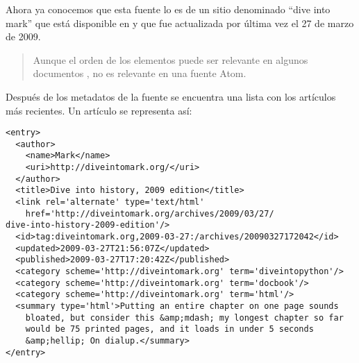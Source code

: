 Ahora ya conocemos que esta fuente lo es de un sitio denominado ``dive into mark'' que está disponible en  y que fue actualizada por última vez el 27 de marzo de 2009.

\begin{quote}
Aunque el orden de los elementos puede ser relevante en algunos documentos , no es relevante en una fuente Atom.
\end{quote}

Después de los metadatos de la fuente se encuentra una lista con los artículos más recientes. Un artículo se representa así:

\noindent\begin{minipage}{\textwidth}
\begin{lstlisting}[mathescape=True]
<entry>
  <author>
    <name>Mark</name>
    <uri>http://diveintomark.org/</uri>
  </author>
  <title>Dive into history, 2009 edition</title>
  <link rel='alternate' type='text/html'     
    href='http://diveintomark.org/archives/2009/03/27/
dive-into-history-2009-edition'/>
  <id>tag:diveintomark.org,2009-03-27:/archives/20090327172042</id>
  <updated>2009-03-27T21:56:07Z</updated>     
  <published>2009-03-27T17:20:42Z</published>        
  <category scheme='http://diveintomark.org' term='diveintopython'/>
  <category scheme='http://diveintomark.org' term='docbook'/>
  <category scheme='http://diveintomark.org' term='html'/>
  <summary type='html'>Putting an entire chapter on one page sounds
    bloated, but consider this &amp;mdash; my longest chapter so far
    would be 75 printed pages, and it loads in under 5 seconds
    &amp;hellip; On dialup.</summary>
</entry>             
\end{lstlisting}
\end{minipage}

